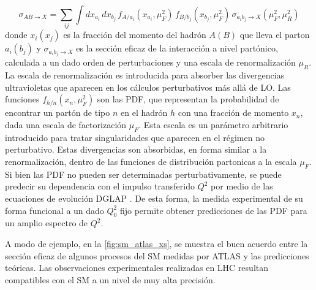 \begin{equation}
  \sigma_{AB\to X} = \sum_{ij} \int dx_{a_i} \, dx_{b_j} \, f_{A/a_i} (x_{a_i}, \mu_F^2) \, f_{B/b_j} (x_{b_j}, \mu_F^2) \, \sigma_{a_i b_j\to X}(\mu_F^2,\mu_R^2)
\end{equation}
%
donde $x_i(x_j)$ es la fracción del momento del hadrón $A(B)$ que lleva el
parton $a_i(b_j)$ y $\sigma_{a_i b_j\to X}$ es la sección eficaz de la
interacción a nivel partónico, calculada a un dado orden de perturbaciones y una
escala de renormalización $\mu_R$. La escala de renormalización es introducida
para absorber las divergencias ultravioletas que aparecen en los cálculos
perturbativos más allá de LO. Las funciones $f_{h/n}(x_n,\mu_F^2)$ son las PDF,
que representan la probabilidad de encontrar un partón de tipo $n$ en el hadrón
$h$ con una fracción de momento $x_n$, dada una escala de factorización $\mu_F$.
Esta escala es un parámetro arbitrario introducido para tratar singularidades
que aparecen en el régimen no perturbativo. Estas divergencias son absorbidas,
en forma similar a la renormalización, dentro de las funciones de distribución
partonicas a la escala $\mu_F$. Si bien las PDF no pueden ser determinadas
perturbativamente, se puede predecir su dependencia con el impulso transferido $Q^2$
por medio de las
ecuaciones de evolución DGLAP \cite{Gribov:1972ri,Lipatov:1974qm,ALTARELLI1977298}.
De esta forma, la medida experimental de su
forma funcional a un dado $Q_0^2$ fijo permite obtener predicciones de las PDF
para un amplio espectro de $Q^2$.


A modo de ejemplo, en la \cref{fig:sm_atlas_xs}, se muestra el buen acuerdo
entre la sección eficaz de algunos procesos del SM medidas por ATLAS y las
predicciones teóricas. Las observaciones experimentales realizadas en LHC
resultan compatibles con el SM a un nivel de muy alta precisión.

